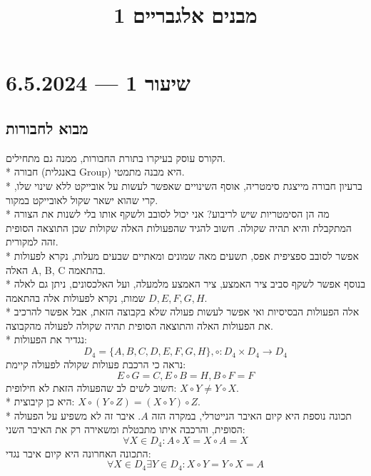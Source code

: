 
\title{מבנים אלגבריים 1}
\setcounter{secnumdepth}{2}

\hypersetup{}

\maketitle
\maketitleprint{}

\tableofcontents

\section{שיעור 1 --- 6.5.2024}
\subsection{מבוא לחבורות}
הקורס עוסק בעיקרו בתורת החבורות, ממנה גם מתחילים. \\*
חבורה (באנגלית Group) היא מבנה מתמטי. \\*
ברעיון חבורה מייצגת סימטריה, אוסף השינויים שאפשר לעשות על אובייקט ללא שינוי שלו, קרי שהוא ישאר שקול לאובייקט במקור. \\*
מה הן הסימטריות שיש לריבוע? אני יכול לסובב ולשקף אותו בלי לשנות את הצורה המתקבלת והיא תהיה שקולה. חשוב להגיד שהפעולות האלה שקולות שכן התוצאה הסופית זהה למקורית. \\*
אפשר לסובב ספציפית אפס, תשעים מאה שמונים ומאתיים שבעים מעלות, נקרא לפעולות האלה A, B, C בהתאמה. \\*
בנוסף אפשר לשקף סביב ציר האמצע, ציר האמצע מלמעלה, ועל האלכסונים, ניתן גם לאלה שמות, נקרא לפעולות אלה בהתאמה $D, E, F, G, H$. \\*
אלה הפעולות הבסיסיות ואי אפשר לעשות פעולה שלא בקבוצה הזאת, אבל אפשר להרכיב את הפעולות האלה והתוצאה הסופית תהיה שקולה לפעולה מהקבוצה. \\*
נגדיר את הפעולות:
\[
	D_4 = \{ A, B, C, D, E, F, G, H \},
	\circ : D_4 \times D_4 \to D_4
\]
נראה כי הרכבת פעולות שקולה לפעולה קיימת:
\[
	E \circ G = C,
	E \circ B = H,
	B \circ F = F
\]
חשוב לשים לב שהפעולה הזאת לא חילופית: $X \circ Y \ne Y \circ X$. \\*
היא כן קיבוצית: $X \circ (Y \circ Z) = (X \circ Y) \circ Z$. \\*
תכונה נוספת היא קיום האיבר הנייטרלי, במקרה הזה $A$. איבר זה לא משפיע על הפעולה הסופית, והרכבה איתו מתבטלת ומשאירה רק את האיבר השני:
\[
	\forall X \in D_4 : A \circ X = X \circ A = X
\]
התכונה האחרונה היא קיום איבר נגדי:
\[
	\forall X \in D_4 \exists Y \in D_4 : X \circ Y = Y \circ X = A
\]

